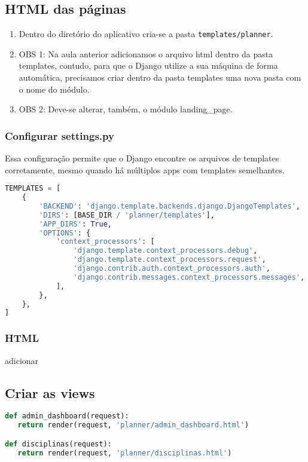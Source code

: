 \subsection{HTML das páginas}
\begin{enumerate}
    \item Dentro do diretório do aplicativo cria-se a pasta \texttt{templates/planner}.
    \item OBS 1: Na aula anterior adicionamos o arquivo html dentro da pasta templates, contudo, para que o Django utilize a sua máquina de forma automática, precisamos criar dentro da pasta templates uma nova pasta com o nome do módulo.
\item OBS 2: Deve-se alterar, também, o módulo landing\_page.
\end{enumerate}

\subsubsection{Configurar settings.py}
Essa configuração permite que o Django encontre os arquivos de templates corretamente, mesmo quando há múltiplos apps com templates semelhantes.
\begin{lstlisting}[language=Python]
    TEMPLATES = [
    {
        'BACKEND': 'django.template.backends.django.DjangoTemplates',
        'DIRS': [BASE_DIR / 'planner/templates'],
        'APP_DIRS': True,
        'OPTIONS': {
            'context_processors': [
                'django.template.context_processors.debug',
                'django.template.context_processors.request',
                'django.contrib.auth.context_processors.auth',
                'django.contrib.messages.context_processors.messages',
            ],
        },
    },
]

\end{lstlisting}

\subsubsection{HTML}

adicionar

\subsection{Criar as views}
\begin{lstlisting}[language=Python]
def admin_dashboard(request):
   return render(request, 'planner/admin_dashboard.html')

def disciplinas(request):
   return render(request, 'planner/disciplinas.html')
\end{lstlisting}
